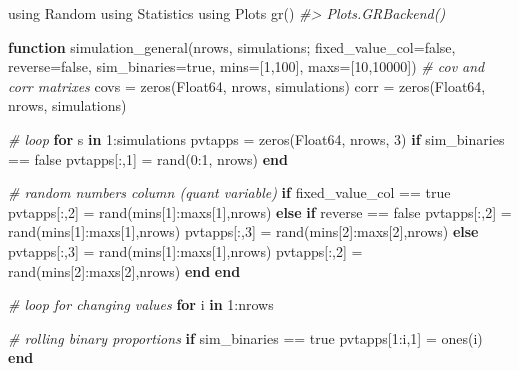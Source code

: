 \documentclass[]{article}
\newenvironment{Shaded}{\begin{snugshade}}{\end{snugshade}}
\newcommand{\CommentTok}[1]{\textcolor[rgb]{0.56,0.35,0.01}{\textit{#1}}}
\newcommand{\DataTypeTok}[1]{\textcolor[rgb]{0.13,0.29,0.53}{#1}}
\newcommand{\FloatTok}[1]{\textcolor[rgb]{0.00,0.00,0.81}{#1}}
\newcommand{\KeywordTok}[1]{\textcolor[rgb]{0.13,0.29,0.53}{\textbf{#1}}}
\newcommand{\NormalTok}[1]{#1}
\begin{document}
\begin{Shaded}
\begin{Highlighting}[]
\NormalTok{using Random}
\NormalTok{using Statistics}
\NormalTok{using Plots}
\NormalTok{gr()}
\CommentTok{#> Plots.GRBackend()}

\KeywordTok{function}\NormalTok{ simulation_general(nrows, simulations; fixed_value_col=false, }
\NormalTok{    reverse=false, sim_binaries=true, mins=[}\FloatTok{1}\NormalTok{,}\FloatTok{100}\NormalTok{], maxs=[}\FloatTok{10}\NormalTok{,}\FloatTok{10000}\NormalTok{]) }
    \CommentTok{# cov and corr matrixes}
\NormalTok{    covs = zeros(}\DataTypeTok{Float64}\NormalTok{, nrows, simulations)}
\NormalTok{    corr = zeros(}\DataTypeTok{Float64}\NormalTok{, nrows, simulations)}

    \CommentTok{# loop}
    \KeywordTok{for}\NormalTok{ s }\KeywordTok{in} \FloatTok{1}\NormalTok{:simulations}
\NormalTok{        pvtapps = zeros(}\DataTypeTok{Float64}\NormalTok{, nrows, }\FloatTok{3}\NormalTok{)}
        \KeywordTok{if}\NormalTok{ sim_binaries == false}
\NormalTok{            pvtapps[:,}\FloatTok{1}\NormalTok{] = rand(}\FloatTok{0}\NormalTok{:}\FloatTok{1}\NormalTok{, nrows)}
        \KeywordTok{end}

        \CommentTok{# random numbers column (quant variable)}
        \KeywordTok{if}\NormalTok{ fixed_value_col == true}
\NormalTok{            pvtapps[:,}\FloatTok{2}\NormalTok{] = rand(mins[}\FloatTok{1}\NormalTok{]:maxs[}\FloatTok{1}\NormalTok{],nrows)}
        \KeywordTok{else}
            \KeywordTok{if}\NormalTok{ reverse == false}
\NormalTok{                pvtapps[:,}\FloatTok{2}\NormalTok{] = rand(mins[}\FloatTok{1}\NormalTok{]:maxs[}\FloatTok{1}\NormalTok{],nrows)}
\NormalTok{                pvtapps[:,}\FloatTok{3}\NormalTok{] = rand(mins[}\FloatTok{2}\NormalTok{]:maxs[}\FloatTok{2}\NormalTok{],nrows)}
            \KeywordTok{else} 
\NormalTok{                pvtapps[:,}\FloatTok{3}\NormalTok{] = rand(mins[}\FloatTok{1}\NormalTok{]:maxs[}\FloatTok{1}\NormalTok{],nrows)}
\NormalTok{                pvtapps[:,}\FloatTok{2}\NormalTok{] = rand(mins[}\FloatTok{2}\NormalTok{]:maxs[}\FloatTok{2}\NormalTok{],nrows)}
            \KeywordTok{end}
        \KeywordTok{end}

        \CommentTok{# loop for changing values}
        \KeywordTok{for}\NormalTok{ i }\KeywordTok{in} \FloatTok{1}\NormalTok{:nrows}

            \CommentTok{# rolling binary proportions}
            \KeywordTok{if}\NormalTok{ sim_binaries == true}
\NormalTok{                pvtapps[}\FloatTok{1}\NormalTok{:i,}\FloatTok{1}\NormalTok{] = ones(i)}
            \KeywordTok{end}


\end{Highlighting}
\end{Shaded}
\end{document}

